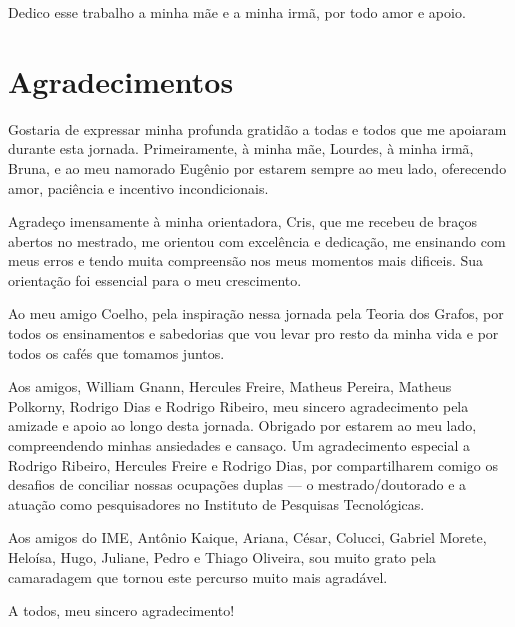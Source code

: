 
\begin{dedicatoria}
Dedico esse trabalho a minha mãe e a minha irmã, por todo amor e apoio.
\end{dedicatoria}


\chapter*{Agradecimentos}
Gostaria de expressar minha profunda gratidão a todas e todos que me apoiaram durante esta jornada.
Primeiramente, à minha mãe, Lourdes, à minha irmã, Bruna, e ao meu namorado Eugênio por estarem sempre ao meu lado, oferecendo amor, paciência e incentivo incondicionais.

Agradeço imensamente à minha orientadora, Cris, que me recebeu de braços abertos no mestrado, me orientou com excelência e dedicação, me ensinando com meus erros e tendo muita compreensão nos meus momentos mais dificeis.
Sua orientação foi essencial para o meu crescimento.

Ao meu amigo Coelho, pela inspiração nessa jornada pela Teoria dos Grafos, por todos os ensinamentos e sabedorias que vou levar pro resto da minha vida e por todos os cafés que tomamos juntos.

Aos amigos, William Gnann, Hercules Freire, Matheus Pereira, Matheus Polkorny, Rodrigo Dias e Rodrigo Ribeiro, meu sincero agradecimento pela amizade e apoio ao longo desta jornada.
Obrigado por estarem ao meu lado, compreendendo minhas ansiedades e cansaço.
Um agradecimento especial a Rodrigo Ribeiro, Hercules Freire e Rodrigo Dias, por compartilharem comigo os desafios de conciliar nossas ocupações duplas — o mestrado/doutorado e a atuação como pesquisadores no Instituto de Pesquisas Tecnológicas.

Aos amigos do IME, Antônio Kaique, Ariana, César, Colucci, Gabriel Morete, Heloísa, Hugo, Juliane, Pedro e Thiago Oliveira, sou muito grato pela camaradagem que tornou este percurso muito mais agradável.

A todos, meu sincero agradecimento!
